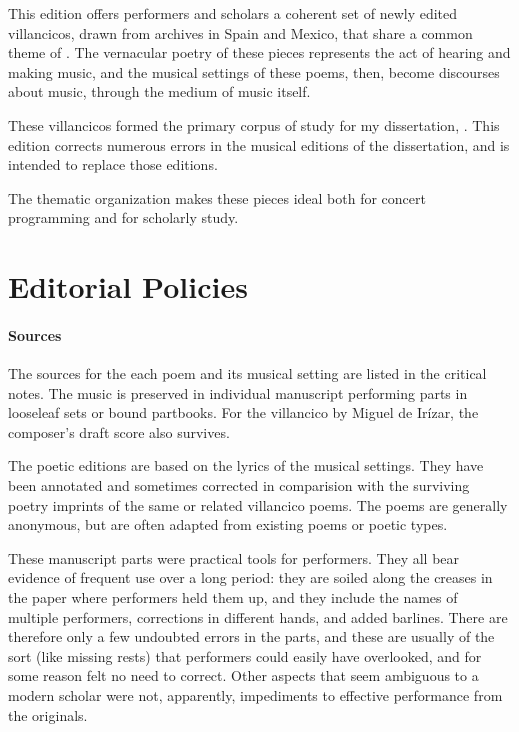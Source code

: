 This edition offers performers and scholars a coherent set of newly edited villancicos, drawn from archives in Spain and Mexico, that share a common theme of .
The vernacular poetry of these pieces represents the act of hearing and making music, and the musical settings of these poems, then, become discourses about music, through the medium of music itself.%
  \begin{Footnote}
  These villancicos formed the primary corpus of study for my dissertation, \citemydiss.
  This edition corrects numerous errors in the musical editions of the dissertation, and is intended to replace those editions.
  \end{Footnote}
The thematic organization makes these pieces ideal both for concert programming and for scholarly study.

\section{Editorial Policies}

\paragraph{Sources}

The sources for the each poem and its musical setting are listed in the critical notes.
The music is preserved in individual manuscript performing parts in looseleaf sets or bound partbooks.
For the villancico by Miguel de Irízar, the composer's draft score also survives.

The poetic editions are based on the lyrics of the musical settings.
They have been annotated and sometimes corrected in comparision with the surviving poetry imprints of the same or related villancico poems.
The poems are generally anonymous, but are often adapted from existing poems or poetic types.

These manuscript parts were practical tools for performers.
They all bear evidence of frequent use over a long period: they are soiled along the creases in the paper where performers held them up, and they include the names of multiple performers, corrections in different hands, and added barlines.
There are therefore only a few undoubted errors in the parts, and these are usually of the sort (like missing rests) that performers could easily have overlooked, and for some reason felt no need to correct.
Other aspects that seem ambiguous to a modern scholar were not, apparently, impediments to effective performance from the originals.

